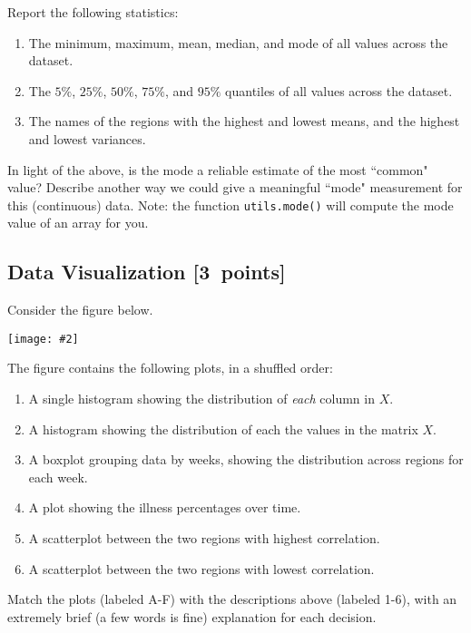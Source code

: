 \documentclass{article}
\newcommand{\blu}[1]{{\textcolor{blu}{#1}}}
\let\ask\blu
\newcommand\pts[1]{\textcolor{pointscolour}{[#1~points]}}
\newcommand{\centerfig}[2]{\begin{center}\texttt{[image: \#2]}\end{center}}
\begin{document}
  \ask{Report the following statistics}:
  \begin{enumerate}
  \item The minimum, maximum, mean, median, and mode of all values across the dataset.
  \item The $5\%$, $25\%$, $50\%$, $75\%$, and $95\%$ quantiles of all values across the dataset.
  \item The names of the regions with the highest and lowest means, and the highest and lowest variances.%
  \end{enumerate}
  In light of the above, \ask{is the mode a reliable estimate of the most ``common" value? Describe another way we could give a meaningful ``mode" measurement for this (continuous) data.} Note: the function \texttt{utils.mode()} will compute the mode value of an array for you.


  


  \subsection{Data Visualization \pts{3}}

  Consider the figure below.

  \centerfig{.9}{./figs/visualize-unlabeled}

  The figure contains the following plots, in a shuffled order:
  \begin{enumerate}
  \item A single histogram showing the distribution of \emph{each} column in $X$.
  \item A histogram showing the distribution of each the values in the matrix $X$.
  \item A boxplot grouping data by weeks, showing the distribution across regions for each week.
  \item A plot showing the illness percentages over time.
  \item A scatterplot between the two regions with highest correlation.
  \item A scatterplot between the two regions with lowest correlation.
  \end{enumerate}

  \ask{Match the plots (labeled A-F) with the descriptions above (labeled 1-6), with an extremely brief (a few words is fine) explanation for each decision.}
\end{document}
